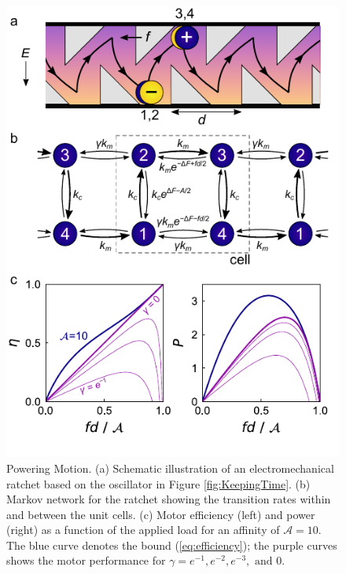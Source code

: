 \begin{appendices}
\begin{figure}[ht]
    \centering
    \includegraphics{figures/A5_PoweringMotion.pdf}
    \caption{Powering Motion. (a) Schematic illustration of an electromechanical ratchet based on the oscillator in Figure \ref{fig:KeepingTime}. (b) Markov network for the ratchet showing the transition rates within and between the unit cells. (c) Motor efficiency (left) and power (right) as a function of the applied load for an affinity of $\mathcal{A}=10$. The blue curve denotes the bound (\ref{eq:efficiency}); the purple curves shows the motor performance for $\gamma=e^{-1}, e^{-2}, e^{-3},  \text{ and } 0$.}
    \label{fig:PoweringMotion}
\end{figure}


\end{appendices}
